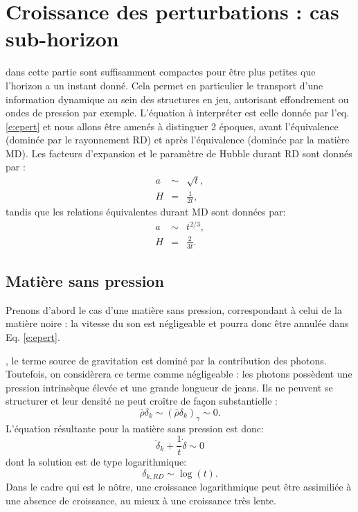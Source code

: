  \section{Croissance des perturbations : cas sub-horizon}
  dans cette partie sont suffisamment compactes pour être plus petites que l'horizon a un instant donné. Cela permet en particulier le transport d'une information dynamique au sein des structures en jeu, autorisant effondrement ou ondes de pression par exemple. L'équation à interpréter est celle donnée par l'eq. \ref{e:epert} et nous allons être amenés à distinguer 2 époques, avant l'équivalence (dominée par le rayonnement RD) et après l'équivalence (dominée par la matière MD). Les facteurs d'expansion et le paramètre de Hubble  durant RD sont donnés par :
 \begin{eqnarray}
 a&\sim& \sqrt{t},\\
 H&=&\frac{1}{2t},
 \end{eqnarray}
 tandis que les relations équivalentes durant MD sont données par:
 \begin{eqnarray}
 a&\sim&t^{2/3},\\
 H&=&\frac{2}{3t}.
 \end{eqnarray}
 
  \subsection{Matière sans pression}
Prenons d'abord le cas d'une matière sans pression, correspondant à celui de la matière noire : la vitesse du son est négligeable et pourra donc être annulée dans Eq. \ref{e:epert}.

, le terme source de gravitation est dominé par la contribution des photons. Toutefois, on considèrera ce terme comme négligeable : les photons possèdent une pression intrinsèque élevée et une grande longueur de jeans. Ils ne peuvent se structurer et leur densité ne peut croître de façon substantielle :
\begin{equation}
\bar \rho \delta_k \sim(\bar \rho \delta_k)_\gamma \sim 0.
\end{equation}
L'équation résultante pour la matière sans pression est donc: 
\begin{equation}
\ddot \delta_k+\frac{1}{t}\dot \delta \sim 0
\end{equation}
dont la solution est de type logarithmique:
\begin{equation}
\delta_{k,RD}\sim \log(t).
\end{equation}
Dans le cadre qui est le nôtre, une croissance logarithmique peut être assimiliée à une absence de croissance, au mieux à une croissance très lente.

